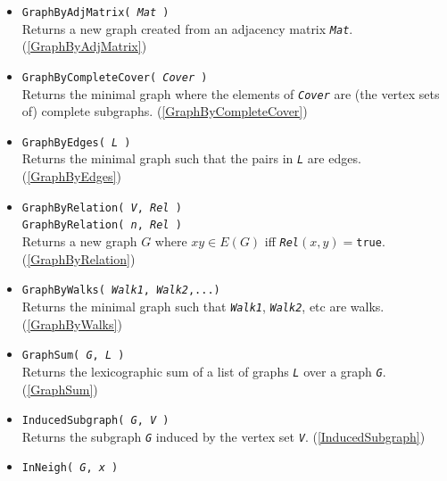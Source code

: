 \documentclass[a4paper,11pt]{report}
\begin{document}
{{\begin{itemize}
 Returns a new graph having \mbox{\texttt{\mdseries\slshape AdjList}} as its list of adjacencies. (\ref{GraphByAdjacencies}) 
\item \texttt{GraphByAdjMatrix( \mbox{\texttt{\mdseries\slshape Mat}} )}\\
 Returns a new graph created from an adjacency matrix \mbox{\texttt{\mdseries\slshape Mat}}. (\ref{GraphByAdjMatrix}) 
\item \texttt{GraphByCompleteCover( \mbox{\texttt{\mdseries\slshape Cover}} )}\\
 Returns the minimal graph where the elements of \mbox{\texttt{\mdseries\slshape Cover}} are (the vertex sets of) complete subgraphs. (\ref{GraphByCompleteCover}) 
\item \texttt{GraphByEdges( \mbox{\texttt{\mdseries\slshape L}} )}\\
 Returns the minimal graph such that the pairs in \mbox{\texttt{\mdseries\slshape L}} are edges. (\ref{GraphByEdges}) 
\item \texttt{GraphByRelation( \mbox{\texttt{\mdseries\slshape V}}, \mbox{\texttt{\mdseries\slshape Rel}} )}\\
 \texttt{GraphByRelation( \mbox{\texttt{\mdseries\slshape n}}, \mbox{\texttt{\mdseries\slshape Rel}} )}\\
 Returns a new graph $G$ where $xy \in E(G)$ iff \mbox{\texttt{\mdseries\slshape Rel}}$(x,y)=$\texttt{true}. (\ref{GraphByRelation}) 
\item \texttt{GraphByWalks( \mbox{\texttt{\mdseries\slshape Walk1}}, \mbox{\texttt{\mdseries\slshape Walk2}},...)}\\
 Returns the minimal graph such that \mbox{\texttt{\mdseries\slshape Walk1}}, \mbox{\texttt{\mdseries\slshape Walk2}}, etc are walks. (\ref{GraphByWalks}) 
\item \texttt{GraphSum( \mbox{\texttt{\mdseries\slshape G}}, \mbox{\texttt{\mdseries\slshape L}} )}\\
 Returns the lexicographic sum of a list of graphs \mbox{\texttt{\mdseries\slshape L}} over a graph \mbox{\texttt{\mdseries\slshape G}}. (\ref{GraphSum}) 
\item \texttt{InducedSubgraph( \mbox{\texttt{\mdseries\slshape G}}, \mbox{\texttt{\mdseries\slshape V}} )}\\
 Returns the subgraph \mbox{\texttt{\mdseries\slshape G}} induced by the vertex set \mbox{\texttt{\mdseries\slshape V}}. (\ref{InducedSubgraph}) 
\item \texttt{InNeigh( \mbox{\texttt{\mdseries\slshape G}}, \mbox{\texttt{\mdseries\slshape x}} )}\\

\end{itemize}}}
\end{document}

